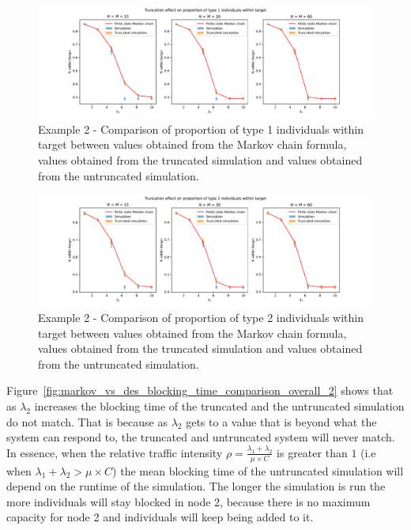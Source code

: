 \begin{figure}[H]
    \includegraphics[width=\textwidth]{chapters/03_queueing_model/Bin/numeric_results_and_timings/truncation_effect_2/proportion_type_1.pdf}
    \caption{
        Example 2 - Comparison of proportion of type 1 individuals within
        target between values
        obtained from the Markov chain formula, values obtained from the
        truncated simulation and values obtained from the untruncated
        simulation.
    }
    \label{fig:markov_vs_des_proportion_within_time_comparison_type_1_2}
\end{figure}

\begin{figure}[H]
    \includegraphics[width=\textwidth]{chapters/03_queueing_model/Bin/numeric_results_and_timings/truncation_effect_2/proportion_type_2.pdf}
    \caption{
        Example 2 - Comparison of proportion of type 2 individuals within
        target between values
        obtained from the Markov chain formula, values obtained from the
        truncated simulation and values obtained from the untruncated
        simulation.
    }
    \label{fig:markov_vs_des_proportion_within_time_comparison_type_2_2}
\end{figure}


Figure~\ref{fig:markov_vs_des_blocking_time_comparison_overall_2} shows that as
\(\lambda_2\) increases the blocking time of the truncated and the untruncated
simulation do not match.
That is because as \(\lambda_2\) gets to a value that is beyond what the system
can respond to, the truncated and untruncated system will never match.
In essence, when the relative traffic intensity
\(\rho = \frac{\lambda_1 + \lambda_2}{\mu \times C}\) is greater than \(1\) (i.e
when \(\lambda_1 + \lambda_2 > \mu \times C\)) the mean blocking time of the
untruncated simulation will depend on the runtime of the simulation.
The longer the simulation is run the more individuals will stay blocked in
node 2, because there is no maximum capacity for node 2 and individuals will
keep being added to it.
